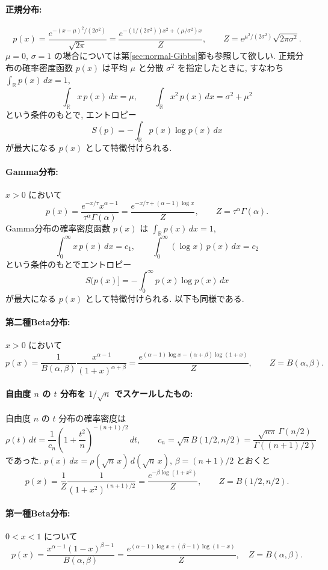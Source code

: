 \documentclass[12pt,twoside]{jarticle}
\newcommand\R{{\mathbb R}} %
\theoremstyle{jplain}
\theoremstyle{jplain}
\theoremstyle{jplain}
\numberwithin{theorem}{section}
\numberwithin{equation}{section}
\numberwithin{figure}{section}
\numberwithin{table}{section}
\newcommand\secref[1]{第\ref{#1}節}
\begin{document}
\paragraph{正規分布:}
\[
p(x)
= \frac{e^{-(x-\mu)^2/(2\sigma^2)}}{\sqrt{2\pi}}
= \frac{e^{-(1/(2\sigma^2))x^2+(\mu/\sigma^2)x}}{Z},
\qquad Z=e^{\mu^2/(2\sigma^2)}\sqrt{2\pi\sigma^2}.
\]
$\mu=0$, $\sigma=1$ の場合については\secref{sec:normal-Gibbs}も参照して欲しい.
正規分布の確率密度函数 $p(x)$ は平均 $\mu$ と分散 $\sigma^2$ を指定したときに,
すなわち $\int_\R p(x)\,dx=1$,
\[
\int_\R x\,p(x)\,dx=\mu, \qquad
\int_\R x^2\,p(x)\,dx = \sigma^2+\mu^2
\]
という条件のもとで, エントロピー
\[
S(p) = -\int_\R p(x)\log p(x)\,dx
\]
が最大になる $p(x)$ として特徴付けられる.

\paragraph{Gamma分布:} $x>0$ において
\[
p(x)=\frac{e^{-x/\tau}x^{\alpha-1}}{\tau^{\alpha}\Gamma(\alpha)}
=\frac{e^{-x/\tau+(\alpha-1)\log x}}{Z},
\qquad
Z=\tau^{\alpha}\Gamma(\alpha).
\]
Gamma分布の確率密度函数 $p(x)$ は $\int_\R p(x)\,dx=1$,
\[
\int_0^\infty x\,p(x)\,dx=c_1, \qquad
\int_0^\infty (\log x)\, p(x)\,dx = c_2
\]
という条件のもとでエントロピー
\[
S(p(x)] = - \int_0^\infty p(x)\log p(x)\,dx
\]
が最大になる $p(x)$ として特徴付けられる. 以下も同様である.

\paragraph{第二種Beta分布:} $x>0$ において
\[
p(x)
=\frac{1}{B(\alpha,\beta)}\frac{x^{\alpha-1}}{(1+x)^{\alpha+\beta}}
=\frac{e^{(\alpha-1)\log x-(\alpha+\beta)\log(1+x)}}{Z},
\qquad
Z=B(\alpha,\beta).
\]

\paragraph{自由度 $n$ の $t$ 分布を $1/\sqrt{n}$ でスケールしたもの:}
自由度 $n$ の $t$ 分布の確率密度は
\[
\rho(t)\,dt
=
\frac{1}{c_n} \left(1+\frac{t^2}{n}\right)^{-(n+1)/2}\,dt,
\qquad
c_n=\sqrt{n}B(1/2,n/2)
=\frac{\sqrt{n\pi}\,\Gamma(n/2)}{\Gamma((n+1)/2)}
\]
であった.
$p(x)\,dx=\rho(\sqrt{n}\,x)\,d(\sqrt{n}\,x)$, $\beta=(n+1)/2$ とおくと
\[
p(x)
=\frac{1}{Z}\frac{1}{(1+x^2)^{(n+1)/2}}
=\frac{e^{-\beta\log(1+x^2)}}{Z},
\qquad
Z=B(1/2,n/2).
\]

\paragraph{第一種Beta分布:} $0<x<1$ について
\[
p(x)
=\frac{x^{\alpha-1}(1-x)^{\beta-1}}{B(\alpha,\beta)}
=\frac{e^{(\alpha-1)\log x+(\beta-1)\log(1-x)}}{Z},
\quad
Z=B(\alpha,\beta).
\]
\end{document}
